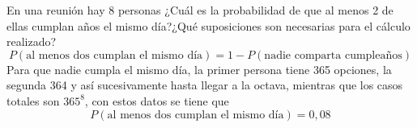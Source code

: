 \item En una reunión hay 8 personas ¿Cuál es la probabilidad de que al menos 2 de ellas cumplan años el mismo día?¿Qué suposiciones son necesarias para el cálculo realizado?
    \[P(\text{al menos dos cumplan el mismo día})=1-P(\text{nadie comparta cumpleaños})\]
    Para que nadie cumpla el mismo día, la primer persona tiene 365 opciones, la segunda 364 y así sucesivamente hasta llegar a la octava, mientras que los casos totales son $365^8$, con estos datos se tiene que
    \[P(\text{al menos dos cumplan el mismo día})=0,08\]